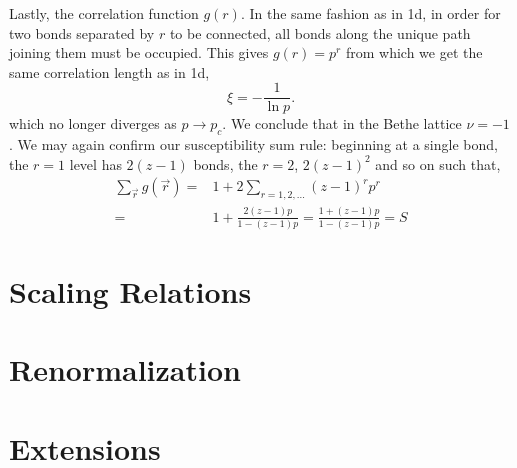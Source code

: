 Lastly, the correlation function $g(r)$.  In the same fashion as in 1d, in order
for two bonds separated by $r$ to be connected, all bonds along the unique path
joining them must be occupied.  This gives $g(r) = p^r$ from which we get the
same correlation length as in 1d,
\[\xi = -\frac{1}{\ln p}.\]
which no longer diverges as $p\to p_c$.  We conclude that in the Bethe lattice
$\nu=-1$.  We may again confirm our susceptibility sum rule: beginning at a single
bond, the $r=1$ level has $2(z-1)$ bonds, the $r=2$, $2(z-1)^2$ and so on such that,
\begin{align*}
\sum_{\vec{r}}g(\vec{r}) =& 1 + 2 \sum_{r=1,2,...} (z-1)^r p^r \\
=& 1 + \frac{2(z-1)p}{1 - (z-1)p} = \frac{1 + (z-1)p}{1 - (z-1)p} = S
\end{align*}
\section{Scaling Relations}

\section{Renormalization}
\section{Extensions}


